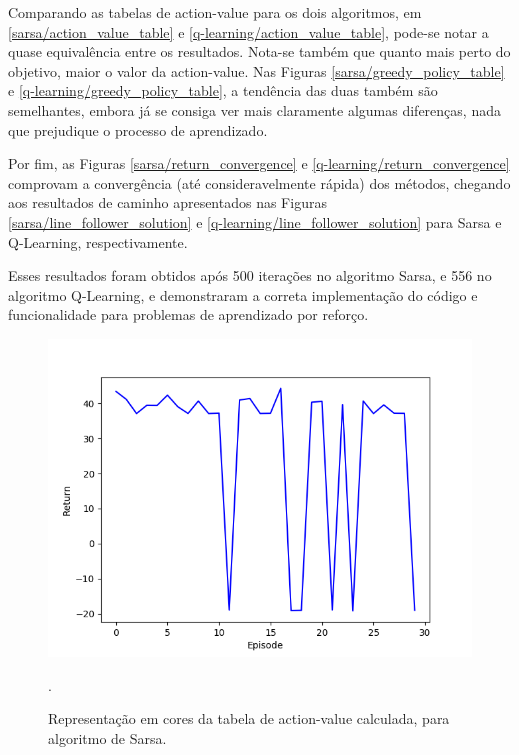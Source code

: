 \documentclass[conference]{IEEEtran}
\begin{document}
Comparando as tabelas de action-value para os dois algoritmos, em \ref{sarsa/action_value_table} e \ref{q-learning/action_value_table}, pode-se notar a quase equivalência entre os resultados. Nota-se também que quanto mais perto do objetivo, maior o valor da action-value. Nas Figuras \ref{sarsa/greedy_policy_table} e \ref{q-learning/greedy_policy_table}, a tendência das duas também são semelhantes, embora já se consiga ver mais claramente algumas diferenças, nada que prejudique o processo de aprendizado.

Por fim, as Figuras \ref{sarsa/return_convergence} e \ref{q-learning/return_convergence} comprovam a convergência (até consideravelmente rápida) dos métodos, chegando aos resultados de caminho apresentados nas Figuras \ref{sarsa/line_follower_solution} e \ref{q-learning/line_follower_solution} para Sarsa e Q-Learning, respectivamente.

Esses resultados foram obtidos após 500 iterações no algoritmo Sarsa, e 556 no algoritmo Q-Learning, e demonstraram a correta implementação do código e funcionalidade para problemas de aprendizado por reforço.

\begin{figure}[htbp]
\centering
\centerline{\includegraphics[scale=0.5]{imagens/dqn_evaluation.png}}
\caption{Representação em cores da tabela de action-value calculada, para algoritmo de Sarsa.}.
\label{dqn_evaluation}
\end{figure}
\end{document}
